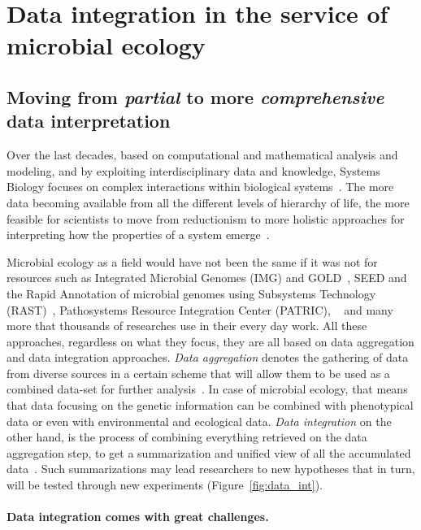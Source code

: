 \section{Data integration in the service of microbial ecology}

   \subsection{Moving from \textit{partial} to more \textit{comprehensive} data interpretation}
   \label{subsec:integration_intro}
      Over the last decades, based on
      computational and mathematical analysis and modeling,
      and by exploiting interdisciplinary data and knowledge, 
      Systems Biology focuses on complex interactions within biological systems~\cite{tavassoly2018systems}.
      The more data becoming available from all the different levels
      of hierarchy of life, the more feasible for scientists to 
      move from reductionism to more holistic approaches 
      for interpreting how the properties of a system emerge~\cite{noble2008music}.

      Microbial ecology as a field would have not been the same if it was not 
      for resources such as 
      Integrated Microbial Genomes (IMG) and GOLD~\cite{chen2021img}, 
      SEED and the Rapid Annotation of microbial genomes using Subsystems Technology (RAST)~\cite{overbeek2014seed}, 
      Pathosystems Resource Integration Center (PATRIC),
      ~\cite{zhulin2015databases}
      and many more that thousands of researches use in their every day work. 
      All these approaches, regardless on what they focus, they are all based on data aggregation and data integration approaches. 
      \textit{Data aggregation} denotes the gathering of data from diverse sources
      in a certain scheme that will allow them to be used as a combined data-set for 
      further analysis~\cite{simpson2010secure}. 
      In case of microbial ecology, that means that data focusing on the genetic 
      information can be combined with phenotypical data or even with environmental and 
      ecological data.
      \textit{Data integration} on the other hand, is the process of combining everything
      retrieved on the data aggregation step, 
      to get a summarization and unified view of all the accumulated data~\cite{schneider2012teaching}.
      Such summarizations may lead researchers to new hypotheses that 
      in turn, will be tested through new experiments (Figure~\ref{fig:data_int}).


      \paragraph{Data integration comes with great challenges.}

